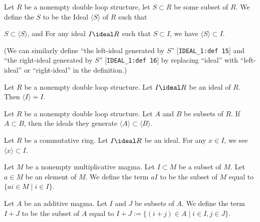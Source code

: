 \begin{definition}
Let $R$ be a nonempty double loop structure, let $S\subset R$ be some subset of $R$.
We define the  $S$ to be the
Ideal $\langle S\rangle$ of $R$ such that
\begin{itemize}
 $S\subset\langle S\rangle$, and
 For any ideal $I\ideal R$
such that $S\subset I$, we have $\langle S\rangle\subset I$.
\end{itemize}
(We can similarly define ``the left-ideal generated by $S$''
[\texttt{IDEAL\_1:def 15}] and ``the right-ideal generated by $S$''
[\texttt{IDEAL\_1:def 16}] by replacing ``ideal'' with ``left-ideal''
or ``right-ideal'' in the definition.)
\end{definition}

\begin{theorem}
Let $R$ be a nonempty double loop structure.
Let $I\ideal R$ be an ideal of $R$.
Then $\langle I\rangle=I$.
\end{theorem}

\begin{theorem}
Let $R$ be a nonempty double loop structure.
Let $A$ and $B$ be subsets of $R$.
If $A\subset B$, then the ideals they generate $\langle A\rangle\subset\langle B\rangle$.
\end{theorem}

\begin{theorem}
Let $R$ be a commutative ring.
Let $I\ideal R$ be an ideal.
For any $x\in I$, we see $\langle x\rangle\subset I$.
\end{theorem}

\begin{definition}
Let $M$ be a nonempty multiplicative magma.
Let $I\subset M$ be a subset of $M$.
Let $a\in M$ be an element of $M$.
We define the term $aI$ to be the subset of $M$ equal to $\{ai\in M\mid i\in I\}$.
\end{definition}

\begin{definition}
Let $A$ be an additive magma.
Let $I$ and $J$ be subsets of $A$.
We define the term $I+J$ to be the subset of $A$ equal to
$I+J:=\{(i+j)\in A\mid i\in I, j\in J\}$.
\end{definition}

